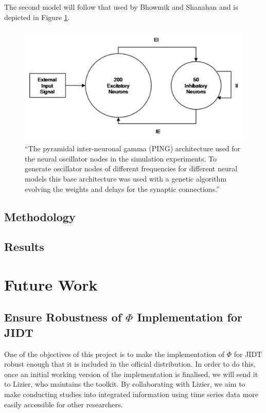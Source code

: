 \documentclass[a4paper,11pt]{article}
\begin{document}
The second model will follow that used by Bhowmik and Shanahan and is depicted in Figure \ref{Bhowmik2013_Schema}.

\begin{figure}[H]
\centering
\includegraphics[scale = 0.75]{Bhowmik2013_Schema}
\caption{``The pyramidal inter-neuronal gamma (PING) architecture used for the neural oscillator nodes in the simulation experiments. To generate oscillator nodes of different frequencies for different neural models this base architecture was used with a genetic algorithm evolving the weights and delays for the synaptic connections.'' \cite{Bhowmik2013}}
\label{Bhowmik2013_Schema}
\end{figure}

\subsection{Methodology}
\subsection{Results}

\section{Future Work} \label{sec:fw}

\subsection{Ensure Robustness of $\Phi$ Implementation for JIDT} \label{sec:fw:jidt}

One of the objectives of this project is to make the implementation of $\Phi$ for JIDT robust enough that it is included in the official distribution. In order to do this, once an initial working version of the implementation is finalised, we will send it to Lizier, who maintains the toolkit. By collaborating with Lizier, we aim to make conducting studies into integrated information using time series data more easily accessible for other researchers.
\end{document}
